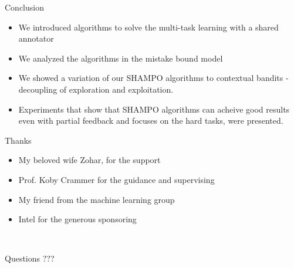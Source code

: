 \documentclass{beamer}
\begin{document}
\begin{frame}{Conclusion}
\begin{itemize}
\item We introduced algorithms to solve the multi-task learning with a shared annotator\newline
\item We analyzed the algorithms in the mistake bound model  \newline
\item We showed a variation of our SHAMPO algorithms to contextual bandits - decoupling of exploration and exploitation.\newline
\item Experiments that show that SHAMPO algorithms can acheive good results even with partial feedback and focuses on the hard tasks, were presented. \newline
\end{itemize}
\end{frame}

\begin{frame}{Thanks }
\begin{itemize}
\item My beloved wife Zohar, for the support\newline
\item Prof. Koby Crammer for  the guidance and  supervising\newline
\item My friend  from the machine learning group\newline
\item Intel  for the generous sponsoring
\end{itemize}

\end{frame}

\begin{frame}{~}
\begin{center}
\begin{Huge}Questions ???\end{Huge}
\end{center}
\end{frame}
\end{document}
